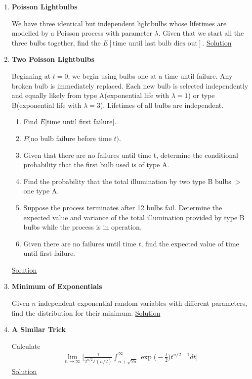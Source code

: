 \documentclass[../probability-notes.tex]{subfiles}
\begin{document}
\begin{enumerate}
    \item \hypertarget{q_poissonbulb}{\textbf{Poisson Lightbulbs}}\newline
    We have three identical but independent lightbulbs whose lifetimes are modelled by a Poisson process with parameter $\lambda$. Given that we start all the three bulbs together, find the $E[\text{time until last bulb dies out}]$. \hyperlink{a_poissonbulb}{Solution}


    \item \hypertarget{q_poissonbulb2}{\textbf{Two Poisson Lightbulbs}}\newline
    Beginning at $t=0$, we begin using bulbs one at a time until failure. Any broken bulb is immediately replaced. Each new bulb is selected independently and equally likely from type A(exponential life with $\lambda = 1$) or type B(exponential life with $\lambda = 3$). Lifetimes of all bulbs are independent.
    \begin{enumerate}
        \item Find $E[$time until first failure$]$.
        \item $P($no bulb failure before time $t)$.
        \item Given that there are no failures until time t, determine the conditional probability that the first bulb used is of type A.
        \item Find the probability that the total illumination by two type B bulbs $>$ one type A.
        \item Suppose the process terminates after 12 bulbs fail. Determine the expected value and variance of the total illumination provided by type B bulbs while the process is in operation.
        \item Given there are no failures until time $t$, find the expected value of time until first failure.
    \end{enumerate}
    \hyperlink{a_poissonbulb2}{Solution}

    \item \hypertarget{q_minexp}{\textbf{Minimum of Exponentials}}\newline
    Given $n$ independent exponential random variables with different parameters, find the distribution for their minimum. \hyperlink{a_minexp}{Solution}

    \item \hypertarget{q_gamma_chi}{\textbf{A Similar Trick}}\newline
    Calculate
    \begin{align*}
         \lim_{n \to \infty} \bigg[ \frac{1}{2^{n/2}\Gamma(n/2)} \int_{n + \sqrt{2n}}^{\infty} \exp \bigg( -\frac{t}{2} \bigg) t^{n/2 - 1} dt \bigg]
    \end{align*} \hyperlink{a_gamma_chi}{Solution}


\end{enumerate}
\end{document}

